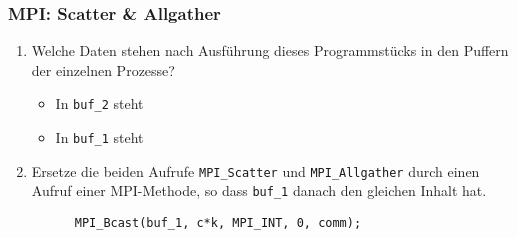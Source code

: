 \documentclass{beamer}
\begin{document}
\begin{frame}[fragile]
  \frametitle{MPI: Scatter \& Allgather}
  \begin{enumerate}
  \item Welche Daten stehen nach Ausführung dieses Programmstücks in den Puffern der einzelnen Prozesse?
    \begin{itemize}
    \item
      In \lstinline{buf_2} steht
    \item
      In \lstinline{buf_1} steht
    \end{itemize}
  \item Ersetze die beiden Aufrufe \lstinline{MPI_Scatter} und \lstinline{MPI_Allgather} durch einen Aufruf einer MPI-Methode,
    so dass \lstinline{buf_1} danach den gleichen Inhalt hat.
    \pause[4]
    \begin{lstlisting}
      MPI_Bcast(buf_1, c*k, MPI_INT, 0, comm);
    \end{lstlisting}
  \end{enumerate}
\end{frame}
\end{document}
